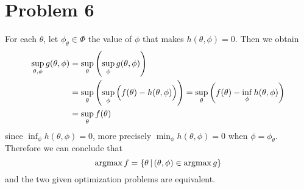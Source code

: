 \documentclass[10pt]{article}
\begin{document}
\section*{Problem 6}
For each $\theta$, let $\phi_\theta \in \Phi$ the value of $\phi$ that makes $h(\theta, \phi) = 0$.
Then we obtain
\begin{align*}
    \sup_{\theta, \phi}g(\theta, \phi) &= \sup_{\theta}\qty(\sup_{\phi}g(\theta, \phi)) \\
    &= \sup_{\theta}\qty(\sup_{\phi}\Big(f(\theta) - h(\theta, \phi)\Big)) = \sup_{\theta}\qty(f(\theta) - \inf_{\phi}h(\theta, \phi)) \\
    &= \sup_{\theta}f(\theta)
\end{align*}
since $\inf_{\phi}h(\theta, \phi) = 0$, more precisely $\min_{\phi}h(\theta, \phi) = 0$ when $\phi = \phi_\theta$.
Therefore we can conclude that
$$\mathrm{argmax}\,f = \qty{\theta \,|\, (\theta, \phi) \in \mathrm{argmax}\,g}$$
and the two given optimization problems are equivalent.
\end{document}
